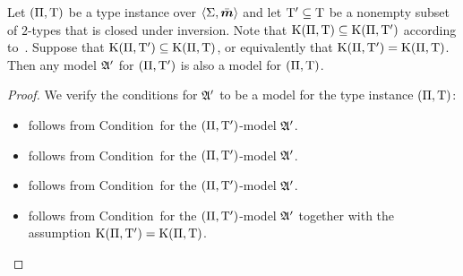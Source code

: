 \begin{remark}\label{rem:tpi-sub-ex}
Let $(\Pi,\mathrm{T})$ be a type instance over $\left\langle \mathrm{\Sigma},\bar{\bm{m}} \right\rangle$ 
and let ${\mathrm{T}'} \subseteq \mathrm{T}$ be a nonempty subset of $2$-types that is
closed under inversion.
Note that $\mathrm{K}(\Pi,\mathrm{T}) \subseteq \mathrm{K}(\Pi,{\mathrm{T}'})$ according
to~.
Suppose that $\mathrm{K}(\Pi,{\mathrm{T}'}) \subseteq \mathrm{K}(\Pi,\mathrm{T})$, or equivalently that
$\mathrm{K}(\Pi,{\mathrm{T}'}) = \mathrm{K}(\Pi,\mathrm{T})$.
Then any model $\mathfrak{A'}$ for $(\Pi,{\mathrm{T}'})$ is also a model for $(\Pi,\mathrm{T})$.
\end{remark}
\begin{proof}
We verify the conditions for $\mathfrak{A'}$ to be a model for the type instance
$(\Pi,\mathrm{T})$:
\begin{itemize}
  \item[\refcondrealizI] follows from Condition~ for the
  $(\Pi,{\mathrm{T}'})$-model $\mathfrak{A'}$.
  \item[\refcondrealizII] follows from Condition~ for the
  $(\Pi,{\mathrm{T}'})$-model $\mathfrak{A'}$.
  \item[\refcondrealizp] follows from Condition~ for the
  $(\Pi,{\mathrm{T}'})$-model $\mathfrak{A'}$.
  \item[\refcondrealizk] follows from Condition~ for the
  $(\Pi,{\mathrm{T}'})$-model $\mathfrak{A'}$ together with the assumption
  $\mathrm{K}(\Pi,{\mathrm{T}'}) = \mathrm{K}(\Pi,\mathrm{T})$.
\end{itemize}
\end{proof}


